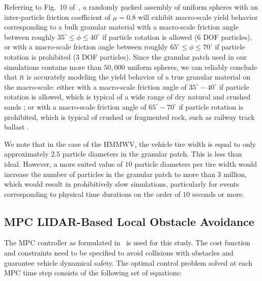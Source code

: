 \documentclass[12pt,twocolumn]{article}
\begin{document}
Referring to Fig.~10 of~\cite{fleischmannetalGEGE2014}, a randomly packed assembly of uniform spheres with an inter-particle friction coefficient of $\mu = 0.8$ will exhibit macro-scale yield behavior corresponding to a bulk granular material with a macro-scale friction angle between roughly $35^\circ \leq \phi \leq 40^\circ$ if particle rotation is allowed (6 DOF particles), or with a macro-scale friction angle between roughly $65^\circ \leq \phi \leq 70^\circ$ if particle rotation is prohibited (3 DOF particles).
%
Since the granular patch used in our simulations contains more than $50,000$ uniform spheres, we can reliably conclude that it is accurately modeling the yield behavior of a true granular material on the macro-scale: either with a macro-scale friction angle of $35^\circ-40^\circ$ if particle rotation is allowed, which is typical of a wide range of dry natural and crushed sands \cite{Cho&Dodds&Santamarina2006}; or with a macro-scale friction angle of $65^\circ-70^\circ$ if particle rotation is prohibited, which is typical of crushed or fragmented rock, such as railway track ballast \cite{Indraratnaetal1998}.

We note that in the case of the HMMWV, the vehicle tire width is equal to only approximately $2.5$ particle diameters in the granular patch.  This is less than ideal.  However, a more suited value of $10$ particle diameters per tire width would increase the number of particles in the granular patch to more than $3$ million, which would result in prohibitively slow simulations, particularly for events corresponding to physical time durations on the order of $10$ seconds or more.


\subsection{MPC LIDAR-Based Local Obstacle Avoidance}\label{ss:MPCImplementation}

The MPC controller as formulated in~\cite{ModelFidelity2016} is used for this study. The cost function and constraints need to be specified to avoid collisions with obstacles and guarantee vehicle dynamical safety. The optimal control problem solved at each MPC time step consists of the following set of equations:
\end{document}
